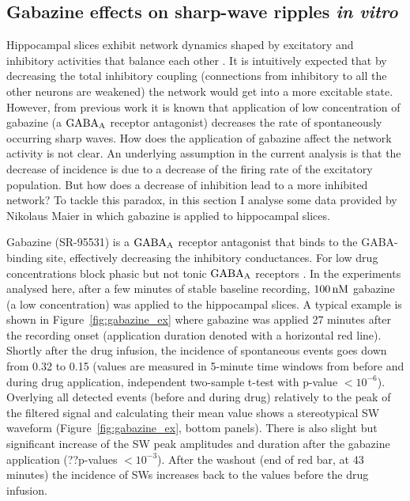   \subsection{Gabazine effects on sharp-wave ripples {\textit {in vitro}} }
    \label{sec:gabazine_invitro}
    Hippocampal slices exhibit network dynamics shaped by excitatory and
    inhibitory activities that balance each other \citep{Maier2011}. It is intuitively expected
    that by decreasing the total inhibitory coupling (connections from
    inhibitory to all the other neurons are weakened) the network would get
    into a more excitable state. However, from previous work
    \citep[e.g.,][]{Nimmrich2005} it is known that application of low
    concentration of gabazine (a $\rm GABA_A$ receptor antagonist) decreases
    the rate of spontaneously occurring sharp waves. How does the application
    of gabazine affect the network activity is not clear. An underlying
    assumption in the current analysis is that the decrease of incidence is due
    to a decrease of the firing rate of the excitatory population. But how does
    a decrease of inhibition lead to a more inhibited network? To tackle this
    paradox, in this section I analyse some data provided by Nikolaus Maier in
    which gabazine is applied to hippocampal slices.
    
    Gabazine (SR-95531) is a $\rm GABA_A$ receptor antagonist that binds to the
    GABA-binding site, effectively decreasing the inhibitory conductances. For
    low drug concentrations block phasic but not tonic $\rm GABA_A$ receptors
    \citep{Bai2001, Yeung2003, Behrens2007}. In the experiments analysed here,
    after a few minutes of stable baseline recording, $100 \,\rm nM$ gabazine
    (a low concentration) was applied to the hippocampal slices. A typical
    example is shown in Figure~\ref{fig:gabazine_ex} where gabazine was applied
    27 minutes after the recording onset (application duration denoted with a
    horizontal red line). Shortly after the drug infusion, the incidence of
    spontaneous events goes down from 0.32 to 0.15 (values are measured in
    5-minute time windows from before and during drug application, independent
    two-sample t-test with p-value $<10^{-6}$). Overlying all detected events
    (before and during drug) relatively to the peak of the filtered signal and
    calculating their mean value shows a stereotypical SW waveform
    (Figure~\ref{fig:gabazine_ex}, bottom panels). There is also slight but
    significant increase of the SW peak amplitudes and duration after the
    gabazine application (??p-values $<10^{-3}$). After the washout (end of red
    bar, at 43 minutes) the incidence of SWs increases back to the values
    before the drug infusion.
    
